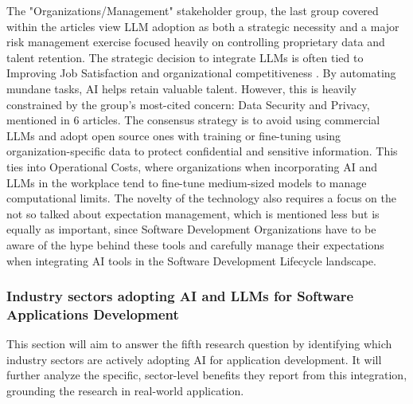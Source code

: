 The "Organizations/Management" stakeholder group, the last group covered within the articles view LLM adoption as both a strategic necessity and a major risk management exercise focused heavily on controlling proprietary data and talent retention. The strategic decision to integrate LLMs is often tied to Improving Job Satisfaction and organizational competitiveness \cite{Jensen:2025me}. By automating mundane tasks, AI helps retain valuable talent. However, this is heavily constrained by the group's most-cited concern: Data Security and Privacy, mentioned in 6 articles. The consensus strategy is to avoid using commercial LLMs and adopt open source ones with training or fine-tuning using organization-specific data to protect confidential and sensitive information. This ties into Operational Costs, where organizations when incorporating AI and LLMs in the workplace tend to fine-tune medium-sized models to manage computational limits. The novelty of the technology also requires a focus on the not so talked about expectation management, which is mentioned less but is equally as important, since Software Development Organizations have to be aware of the hype behind these tools and carefully manage their expectations when integrating AI tools in the Software Development Lifecycle landscape.

\subsubsection{Industry sectors adopting AI and LLMs for Software Applications Development}

This section will aim to answer the fifth research question by identifying which industry sectors are actively adopting AI for application development. It will further analyze the specific, sector-level benefits they report from this integration, grounding the research in real-world application.


